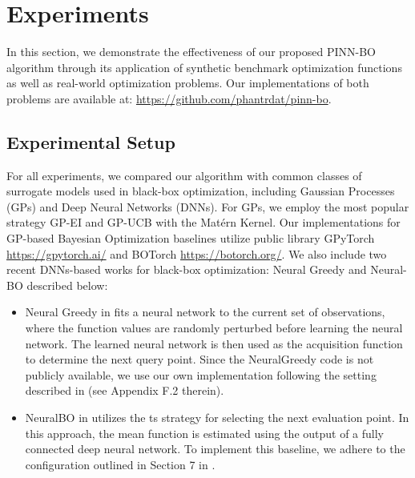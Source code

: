 \section{Experiments}
\label{section:pinn-bo_experiments}
In this section, we demonstrate the effectiveness of our proposed PINN-BO algorithm through its application of synthetic benchmark optimization functions as well as real-world optimization problems. Our implementations of both problems are available at: \url{https://github.com/phantrdat/pinn-bo}.  

\subsection{Experimental Setup}
\label{section:pinn-bo_baselines}
For all experiments, we compared our algorithm with common classes of surrogate models used in black-box optimization, including Gaussian Processes (GPs) and Deep Neural Networks (DNNs). For GPs, we employ the most popular strategy GP-EI \citep{mockus1978application} and GP-UCB \citep{srinivas2009gaussian} with the Mat\'ern Kernel. Our implementations for GP-based Bayesian Optimization baselines utilize public library GPyTorch  \url{https://gpytorch.ai/} and BOTorch \url{https://botorch.org/}. We also include two recent DNNs-based works for black-box optimization: Neural Greedy \citep{pariagreedy} and Neural-BO \citep{phan2023neuralbo} described below:
\begin{itemize}
    \item Neural Greedy in \citet{pariagreedy} fits a neural network to the current set of observations, where the function values are randomly perturbed before learning the neural network. The learned neural network is then used as the acquisition function to determine the next query point. Since the NeuralGreedy code is not publicly available, we use our own implementation following the setting described in     \citet{pariagreedy} (see Appendix F.2 therein).
    \item NeuralBO in \citet{phan2023neuralbo} utilizes the \acl{ts} strategy for selecting the next evaluation point. In this approach, the mean function is estimated using the output of a fully connected deep neural network. To implement this baseline, we adhere to the configuration outlined in Section 7 in \citet{phan2023neuralbo}.
\end{itemize}
